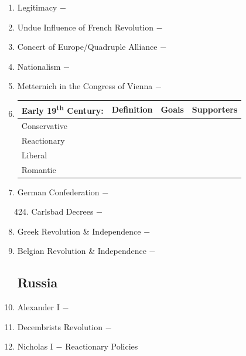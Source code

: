 \documentclass[12pt]{article}
\begin{document}
\begin{enumerate}
\item Legitimacy $-$ 

\item Undue Influence of French Revolution $-$ 

\item Concert of Europe/Quadruple Alliance $-$

\item Nationalism $-$

\item Metternich in the Congress of Vienna $-$

\item \begin{tabular}{l c c c}

\hline  
Early 19\textsuperscript{th} Century: & Definition & Goals & Supporters \\
\hline
Conservative & & & \\
\hline
Reactionary & & & \\
\hline
Liberal & & & \\
\hline
Romantic & & & \\
\hline

\end{tabular}

\item German Confederation $-$

\begin{enumerate}[label=\arabic{*}.]
\setcounter{enumii}{423}

\item Carlsbad Decrees $-$

\end{enumerate}
\setcounter{enumi}{424}

\item Greek Revolution \& Independence $-$

\item Belgian Revolution \& Independence $-$

\subsection{Russia}

\item Alexander I $-$ 

\item Decembrists Revolution $-$ 

\item Nicholas I $-$ Reactionary Policies

\begin{enumerate}[label=\arabic{*}.]
\setcounter{enumii}{429}


\end{enumerate}
\end{enumerate}
\end{document}
